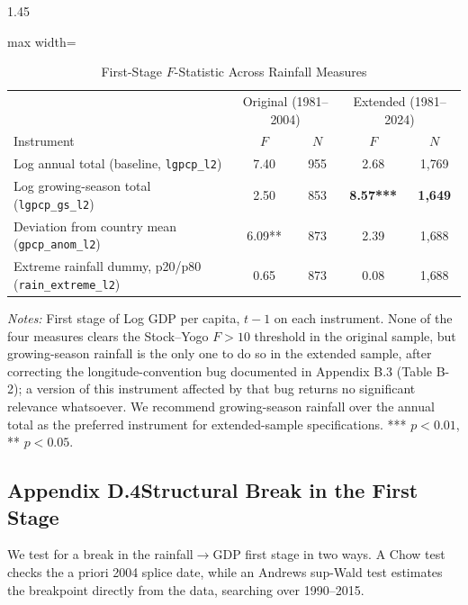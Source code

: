 \documentclass[12pt]{article}
\begin{document}
\begin{bibunit}[jpe]
\begin{spacing}{1.45}
\begin{table}[H]
\centering
\begin{adjustbox}{max width=\textwidth}
\begin{threeparttable}
\caption{First-Stage $F$-Statistic Across Rainfall Measures}
\label{tab:D3}
\begin{tabular}{lcccc}
\toprule
 & \multicolumn{2}{c}{Original (1981--2004)} & \multicolumn{2}{c}{Extended (1981--2024)} \\
Instrument & $F$ & $N$ & $F$ & $N$ \\
\midrule
Log annual total (baseline, \texttt{lgpcp\_l2})     & 7.40 & 955 & 2.68 & 1{,}769 \\
Log growing-season total (\texttt{lgpcp\_gs\_l2})    & 2.50 & 853 & \textbf{8.57***} & \textbf{1{,}649} \\
Deviation from country mean (\texttt{gpcp\_anom\_l2}) & 6.09** & 873 & 2.39 & 1{,}688 \\
Extreme rainfall dummy, p20/p80 (\texttt{rain\_extreme\_l2}) & 0.65 & 873 & 0.08 & 1{,}688 \\
\bottomrule
\end{tabular}
\begin{tablenotes}[flushleft]
\footnotesize
\item \textit{Notes:} First stage of Log GDP per capita, $t-1$ on each instrument. None of the four measures clears the Stock--Yogo $F>10$ threshold in the original sample, but growing-season rainfall is the only one to do so in the extended sample, after correcting the longitude-convention bug documented in Appendix B.3 (Table B-2); a version of this instrument affected by that bug returns no significant relevance whatsoever. We recommend growing-season rainfall over the annual total as the preferred instrument for extended-sample specifications. *** $p<0.01$, ** $p<0.05$.
\end{tablenotes}
\end{threeparttable}
\end{adjustbox}
\end{table}

\subsection*{Appendix D.4\quad Structural Break in the First Stage}

We test for a break in the rainfall$\to$GDP first stage in two ways. A Chow test checks the a priori 2004 splice date, while an Andrews \citep{andrews1993tests} sup-Wald test estimates the breakpoint directly from the data, searching over 1990--2015.


\end{spacing}
\end{bibunit}
\end{document}
